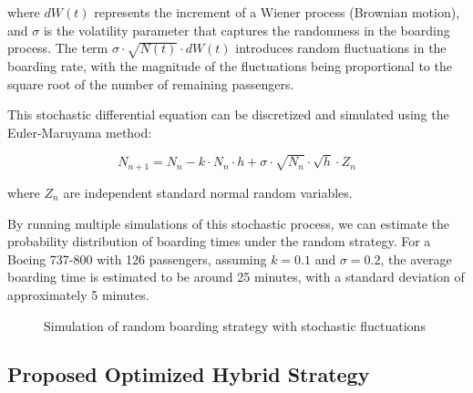 \documentclass[12pt,a4paper]{article}
\begin{document}
where $dW(t)$ represents the increment of a Wiener process (Brownian motion), and $\sigma$ is the volatility parameter that captures the randomness in the boarding process. The term $\sigma \cdot \sqrt{N(t)} \cdot dW(t)$ introduces random fluctuations in the boarding rate, with the magnitude of the fluctuations being proportional to the square root of the number of remaining passengers.

This stochastic differential equation can be discretized and simulated using the Euler-Maruyama method:

\begin{equation}
N_{n+1} = N_n - k \cdot N_n \cdot h + \sigma \cdot \sqrt{N_n} \cdot \sqrt{h} \cdot Z_n
\label{eq:euler_maruyama}
\end{equation}

where $Z_n$ are independent standard normal random variables.

By running multiple simulations of this stochastic process, we can estimate the probability distribution of boarding times under the random strategy. For a Boeing 737-800 with 126 passengers, assuming $k = 0.1$ and $\sigma = 0.2$, the average boarding time is estimated to be around 25 minutes, with a standard deviation of approximately 5 minutes.

\begin{figure}[H]
\centering
{}
\caption{Simulation of random boarding strategy with stochastic fluctuations}
\label{fig:random_boarding}
\end{figure}

\subsection{Proposed Optimized Hybrid Strategy}
\end{document}
